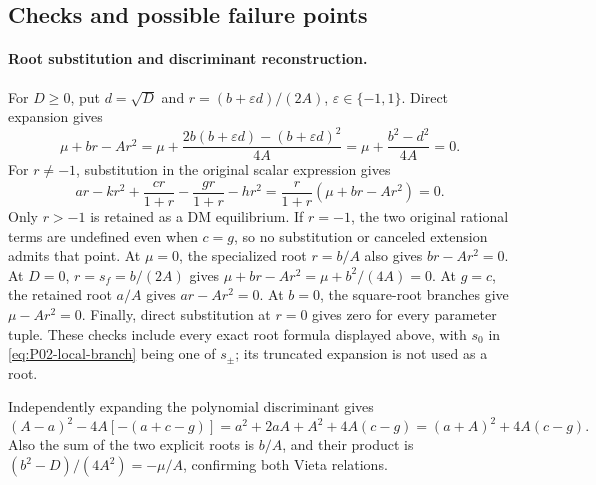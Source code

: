 \subsection{Checks and possible failure points}
\label{subsec:P02-checks}

\paragraph{Root substitution and discriminant reconstruction.}
For $D\ge0$, put $d=\sqrt D$ and
$r=(b+\varepsilon d)/(2A)$, $\varepsilon\in\{-1,1\}$.
Direct expansion gives
\[
 \mu+br-Ar^2
 =\mu+\frac{2b(b+\varepsilon d)-(b+\varepsilon d)^2}{4A}
 =\mu+\frac{b^2-d^2}{4A}=0.
\]
For $r\ne-1$, substitution in the original scalar expression gives
\[
 ar-kr^2+\frac{cr}{1+r}-\frac{gr}{1+r}-hr^2
   =\frac{r}{1+r}(\mu+br-Ar^2)=0.
\]
Only $r>-1$ is retained as a DM equilibrium. If $r=-1$, the two
original rational terms are undefined even when $c=g$, so no
substitution or canceled extension admits that point.
At $\mu=0$, the specialized root $r=b/A$ also gives
$br-Ar^2=0$. At $D=0$, $r=s_f=b/(2A)$ gives
$\mu+br-Ar^2=\mu+b^2/(4A)=0$. At $g=c$, the retained root
$a/A$ gives $ar-Ar^2=0$. At $b=0$, the square-root branches give
$\mu-Ar^2=0$. Finally, direct substitution at $r=0$ gives zero
for every parameter tuple. These checks include every exact root
formula displayed above, with $s_0$ in \eqref{eq:P02-local-branch}
being one of $s_\pm$; its truncated expansion is not used as a root.

Independently expanding the polynomial discriminant gives
\[
 (A-a)^2-4A[-(a+c-g)]
 =a^2+2aA+A^2+4A(c-g)
 =(a+A)^2+4A(c-g).
\]
Also the sum of the two explicit roots is $b/A$, and their product
is $(b^2-D)/(4A^2)=-\mu/A$, confirming both Vieta relations.

